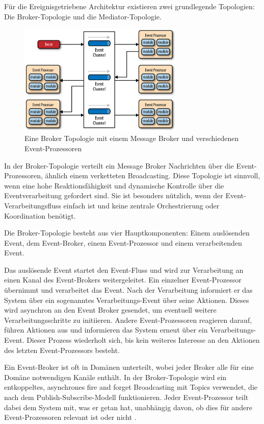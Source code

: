 {Für die Ereignisgetriebene Architektur existieren zwei grundlegende Topologien: Die \glqq Broker-Topologie\grqq{} und die \glqq Mediator-Topologie\grqq.

\begin{figure}[ht]
\centering
\includegraphics[width=0.7\textwidth]{bilder/k2/k2_broker.png}
\caption[Darstellung einer Broker-Topologie in der EDA]{Eine Broker Topologie mit einem Message Broker und verschiedenen Event-Prozessoren \cite{richards}}
\end{figure}

In der Broker-Topologie verteilt ein \glqq Message Broker\grqq{} Nachrichten über die Event-Prozessoren, ähnlich einem verketteten Broadcasting. Diese Topologie ist sinnvoll, wenn eine hohe Reaktionsfähigkeit und dynamische Kontrolle über die Eventverarbeitung gefordert sind. Sie ist besonders nützlich, wenn der Event-Verarbeitungsfluss einfach ist und keine zentrale Orchestrierung oder Koordination benötigt.

Die Broker-Topologie besteht aus vier Hauptkomponenten: Einem auslösenden Event, dem Event-Broker, einem Event-Prozessor und einem verarbeitenden Event.

Das auslösende Event startet den Event-Fluss und wird zur Verarbeitung an einen Kanal des Event-Brokers weitergeleitet. Ein einzelner Event-Prozessor übernimmt und verarbeitet das Event. Nach der Verarbeitung informiert er das System über ein sogenanntes Verarbeitungs-Event über seine Aktionen. Dieses wird asynchron an den Event Broker gesendet, um eventuell weitere Verarbeitungsschritte zu initiieren. Andere Event-Prozessoren reagieren darauf, führen Aktionen aus und informieren das System erneut über ein Verarbeitungs-Event. Dieser Prozess wiederholt sich, bis kein weiteres Interesse an den Aktionen des letzten Event-Prozessors besteht.

Ein Event-Broker ist oft in Domänen unterteilt, wobei jeder Broker alle für eine Domäne notwendigen Kanäle enthält. In der Broker-Topologie wird ein entkoppeltes, asynchrones \glqq fire and forget\grqq{} Broadcasting mit \glqq Topics\grqq{} verwendet, die nach dem \glqq Publish-Subscribe\grqq{}-Modell funktionieren. Jeder Event-Prozessor teilt dabei dem System mit, was er getan hat, unabhängig davon, ob dies für andere Event-Prozessoren relevant ist oder nicht \cite[S.184-186]{richards}.

}
